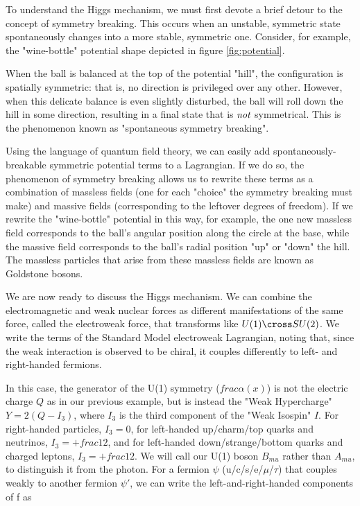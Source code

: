 To understand the Higgs mechanism, we must first devote a brief detour to the concept of symmetry breaking. This occurs when an unstable, symmetric state spontaneously changes into a more stable, symmetric one. Consider, for example, the "wine-bottle" potential shape depicted in figure \ref{fig:potential}.

\begin{figure}
\end{figure}

When the ball is balanced at the top of the potential "hill", the configuration is spatially symmetric: that is, no direction is privileged over any other. However, when this delicate balance is even slightly disturbed, the ball will roll down the hill in some direction, resulting in a final state that is $\emph{not}$ symmetrical. This is the phenomenon known as "spontaneous symmetry breaking".

Using the language of quantum field theory, we can easily add spontaneously-breakable symmetric potential terms to a Lagrangian. If we do so, the phenomenon of symmetry breaking allows us to rewrite these terms as a combination of massless fields (one for each "choice" the symmetry breaking must make) and massive fields (corresponding to the leftover degrees of freedom). If we rewrite the "wine-bottle" potential in this way, for example, the one new massless field corresponds to the ball's angular position along the circle at the base, while the massive field corresponds to the ball's  radial position "up" or "down" the hill. The massless particles that arise from these massless fields are known as Goldstone bosons.

We are now ready to discuss the Higgs mechanism. We can combine the electromagnetic and weak nuclear forces as different manifestations of the same force, called the electroweak force, that transforms like $U(1) \cross SU(2)$. We write the terms of the Standard Model electroweak Lagrangian, noting that, since the weak interaction is observed to be chiral, it couples differently to left- and right-handed fermions.

In this case, the generator of the U(1) symmetry ($frac{\alpha}(x)$) is not the electric charge $Q$ as in our previous example, but is instead the "Weak Hypercharge" $Y = 2(Q -I_{3})$, where $I_{3}$ is the third component of the "Weak Isospin" $I$. For right-handed particles, $I_{3} = 0$, for left-handed up/charm/top quarks and neutrinos, $I_{3} = +frac{1}{2}$, and for left-handed down/strange/bottom quarks and charged leptons, $I_{3} = +frac{1}{2}$. We will call our U(1) boson $B_{mu}$ rather than $A_{mu}$, to distinguish it from the photon. For a fermion $\psi$ (u/c/s/e/$\mu$/$\tau$) that couples weakly to another fermion $\psi'$, we can write the left-and-right-handed components of f as 

